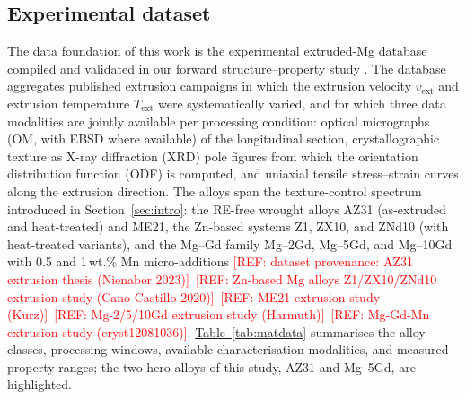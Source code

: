 \documentclass[preprint,12pt]{elsarticle}
\newcommand{\tabref}[1]{\hyperref[#1]{Table~\ref*{#1}}}
\newcommand{\refneeded}[1]{\textcolor{red}{[REF: #1]}} %
\begin{document}
\subsection{Experimental dataset}
\label{sec:dataset}

The data foundation of this work is the experimental extruded-Mg database compiled and validated in our forward structure--property study \cite{Guru2025}. The database aggregates published extrusion campaigns in which the extrusion velocity $v_{\mathrm{ext}}$ and extrusion temperature $T_{\mathrm{ext}}$ were systematically varied, and for which three data modalities are jointly available per processing condition: optical micrographs (OM, with EBSD where available) of the longitudinal section, crystallographic texture as X-ray diffraction (XRD) pole figures from which the orientation distribution function (ODF) is computed, and uniaxial tensile stress--strain curves along the extrusion direction. The alloys span the texture-control spectrum introduced in Section~\ref{sec:intro}: the RE-free wrought alloys AZ31 (as-extruded and heat-treated) and ME21, the Zn-based systems Z1, ZX10, and ZNd10 (with heat-treated variants), and the Mg--Gd family Mg--2Gd, Mg--5Gd, and Mg--10Gd with 0.5 and 1\,wt.\% Mn micro-additions \refneeded{dataset provenance: AZ31 extrusion thesis (Nienaber 2023)}~\refneeded{Zn-based Mg alloys Z1/ZX10/ZNd10 extrusion study (Cano-Castillo 2020)}\cite{Nienaber2019}~\refneeded{ME21 extrusion study (Kurz)}~\refneeded{Mg-2/5/10Gd extrusion study (Harmuth)}~\refneeded{Mg-Gd-Mn extrusion study (cryst12081036)}. \tabref{tab:matdata} summarises the alloy classes, processing windows, available characterisation modalities, and measured property ranges; the two hero alloys of this study, AZ31 and Mg--5Gd, are highlighted.
\end{document}
